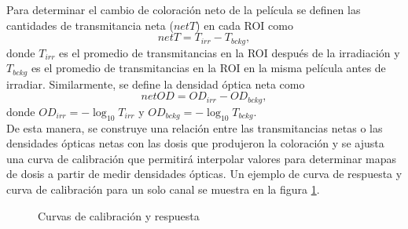 Para determinar el cambio de coloración neto de la película se definen las cantidades de transmitancia neta ($netT$) en cada ROI como
\begin{equation}
	netT=T_{irr}-T_{bckg},
\end{equation}
donde $T_{irr}$ es el promedio de transmitancias en la ROI después de la irradiación y $T_{bckg}$ es el promedio de transmitancias en la ROI en la misma película antes de irradiar. Similarmente, se define la densidad óptica neta como 
\begin{equation}
	netOD=OD_{irr}-OD_{bckg},
\end{equation}
donde $OD_{irr}=-\log_{10}T_{irr}$ y $OD_{bckg}=-\log_{10}T_{bckg}$.\\

De esta manera, se construye una relación entre las transmitancias netas o las densidades ópticas netas con las dosis que produjeron la coloración y se ajusta una curva de calibración que permitirá interpolar valores para determinar mapas de dosis a partir de medir densidades ópticas. Un ejemplo de curva de respuesta y curva de calibración para un solo canal se muestra en la figura \ref{fig:Curvas}.

\begin{figure}[H]
	\centering
	\hfill
	\caption{Curvas de calibración y respuesta}
	\label{fig:Curvas}
\end{figure}

